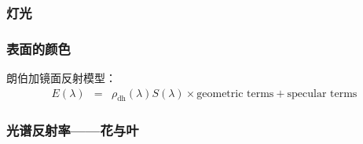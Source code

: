 \documentclass{beamer}
\newcommand{\tmop}[1]{\ensuremath{\operatorname{#1}}}
\begin{document}
{{\begin{frame}
  {\hspace{4em}}
\end{frame}}{\begin{frame}
  \frametitle{灯光}
  
  \qquad{}
\end{frame}}{\begin{frame}
  \frametitle{表面的颜色}
  
  朗伯加镜面反射模型：
  \begin{eqnarray*}
    E (\lambda) & = & \rho_{\tmop{dh}} (\lambda) S (\lambda) \times
    \text{geometric terms} + \text{specular terms}
  \end{eqnarray*}
\end{frame}}{\begin{frame}
  \frametitle{光谱反射率------花与叶}
  

\end{frame}}}
\end{document}
